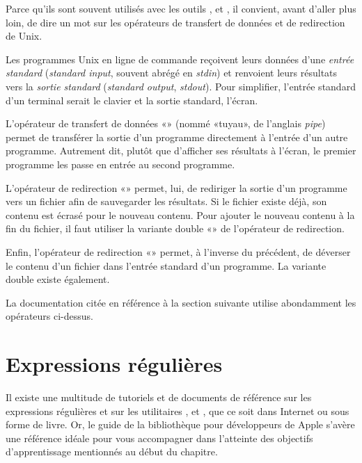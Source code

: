 Parce qu'ils sont souvent utilisés avec les outils ,
 et , il convient, avant d'aller plus loin, de
dire un mot sur les opérateurs de transfert de données et de
redirection de Unix.

Les programmes Unix en ligne de commande reçoivent leurs données d'une
\emph{entrée standard} (\emph{standard
  input}, souvent abrégé en \emph{stdin}) et renvoient leurs résultats
vers la \emph{sortie standard} (\emph{standard output},
\emph{stdout}). Pour simplifier, l'entrée standard d'un terminal
serait le clavier et la sortie standard, l'écran.

L'opérateur de transfert de données %
 «\code{\textbar}»
(nommé «tuyau», de l'anglais \emph{pipe}) permet de
transférer la sortie d'un programme directement à l'entrée d'un autre
programme. Autrement dit, plutôt que d'afficher ses résultats à
l'écran, le premier programme les passe en entrée au second programme.

L'opérateur de redirection %
«\code{>}» permet, lui, de
rediriger la sortie d'un programme vers un fichier afin de sauvegarder
les résultats. Si le fichier existe déjà, son contenu est écrasé pour
le nouveau contenu. Pour ajouter le nouveau contenu à la fin du
fichier, il faut utiliser la variante double %
«\code{>>}» de l'opérateur de
redirection.

Enfin, l'opérateur de redirection %
«\code{<}» permet, à l'inverse du précédent,
de déverser le contenu d'un fichier dans l'entrée standard d'un
programme. La variante double existe également.

La documentation citée en référence à la section suivante utilise
abondamment les opérateurs ci-dessus.


\section{Expressions régulières}
\label{sec:texte:regex}

Il existe une multitude de tutoriels et de documents de référence sur
les expressions régulières et sur les utilitaires ,
 et , que ce soit dans Internet ou sous forme de
livre. Or, le guide  de la bibliothèque
pour développeurs de Apple \citep{Apple:shellprimer} s'avère une
référence idéale pour vous accompagner dans l'atteinte des objectifs
d'apprentissage mentionnés au début du chapitre.

